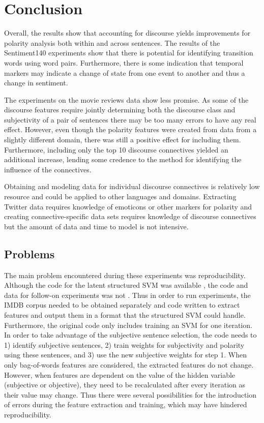 \documentclass[11pt,letterpaper]{article}
\begin{document}
\section{Conclusion}
Overall, the results show that accounting for discourse yields improvements for polarity analysis both within and across sentences.
The results of the Sentiment140 experiments show that there is potential for identifying transition words using word pairs.
Furthermore, there is some indication that temporal markers may indicate a change of state from one event to another and thus
a change in sentiment.

The experiments on the movie reviews data show less promise.  As some of the discourse features require jointly determining both
the discourse class and subjectivity of a pair of sentences there may be too many errors to have any real effect.  
However, even though the polarity features were created from data from a slightly different domain, there was still a positive
effect for including them.  Furthermore, including only the top 10 discourse connectives yielded an additional increase, lending
some credence to the method for identifying the influence of the connectives.

Obtaining and modeling data for individual discourse connectives is relatively low resource and could be applied to other languages and domains.
Extracting Twitter data requires knowledge of emoticons or other markers for polarity and creating connective-specific data sets requires
knowledge of discourse connectives but the amount of data and time to model is not intensive.

\subsection{Problems}
The main problem encountered during these experiments was reproducibility.  Although the code for the latent structured SVM was
available \cite{Yesselina}, the code and data for follow-on experiments was not \cite{Trivedi}.  Thus in order to run 
experiments, the IMDB corpus needed to be obtained separately and code written to extract features and output them in a format
that the structured SVM could handle.  Furthermore, the original code only includes training an SVM for one iteration.  In order to 
take advantage of the subjective sentence selection, the code needs to 1) identify subjective sentences, 2) train weights for subjectivity
and polarity using these sentences, and 3) use the new subjective weights for step 1.  When only bag-of-words features are considered,
the extracted features do not change.  However, when features are dependent on the value of the hidden variable (subjective or objective),
they need to be recalculated after every iteration as their value may change.
Thus there were several
possibilities for the introduction of errors during the feature extraction and training, which may have hindered reproducibility.
\end{document}
